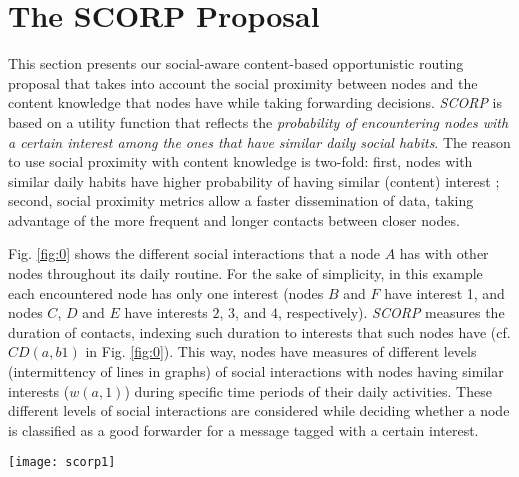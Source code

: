 \documentclass[lnicst]{svmultln}
\begin{document}
\section{The SCORP Proposal\label{sec:SCORP}}

This section presents our social-aware content-based opportunistic
routing proposal that takes into account the social proximity between
nodes and the content knowledge that nodes have while taking forwarding
decisions. \emph{SCORP} is based on a utility function that reflects
the \emph{probability of encountering nodes with a certain interest
among the ones that have similar daily social habits}. The reason
to use social proximity with content knowledge is two-fold: first,
nodes with similar daily habits have higher probability of having
similar (content) interest \cite{socialcast}; second, social proximity
metrics allow a faster dissemination of data, taking advantage of
the more frequent and longer contacts between closer nodes.

Fig. \ref{fig:0} shows the different social interactions that a node
$A$ has with other nodes throughout its daily routine. For the sake
of simplicity, in this example each encountered node has only one
interest (nodes $B$ and $F$ have interest 1, and nodes $C$, $D$
and $E$ have interests $2$, $3$, and $4$, respectively). \emph{SCORP}
measures the duration of contacts, indexing such duration to interests
that such nodes have (cf. $CD(a,b1)$ in Fig. \ref{fig:0}). This
way, nodes have measures of different levels (intermittency of lines
in graphs) of social interactions with nodes having similar interests
($w(a,1)$) during specific time periods of their daily activities.
These different levels of social interactions are considered while
deciding whether a node is classified as a good forwarder for a message
tagged with a certain interest.

\begin{figure*}
\begin{centering}
\vspace{-0.4cm}
\texttt{[image: scorp1]}\vspace{-0.3cm}

\par\end{centering}

\caption{\label{fig:0}Contacts that node $A$ has with nodes having interests
$x$ ($CD(a,x)$) in different daily samples $\Delta T_{i}$.}
\vspace{-0.4cm}
\end{figure*}
\end{document}
